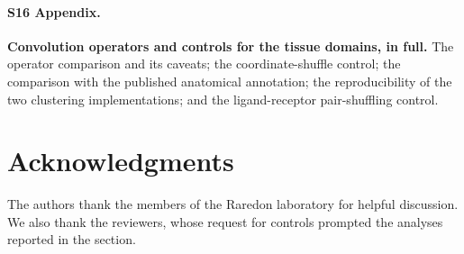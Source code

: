 \documentclass[10pt,letterpaper]{article}
\begin{document}
\paragraph*{S16 Appendix.}
\label{S16_Appendix}
\textbf{Convolution operators and controls for the tissue domains, in full.} The operator comparison and its caveats; the coordinate-shuffle control; the comparison with the published anatomical annotation; the reproducibility of the two clustering implementations; and the ligand-receptor pair-shuffling control.

\section*{Acknowledgments}
The authors thank the members of the Raredon laboratory for helpful discussion. We also
thank the reviewers, whose request for controls prompted the analyses reported in the
 section.

\nolinenumbers


\end{document}
